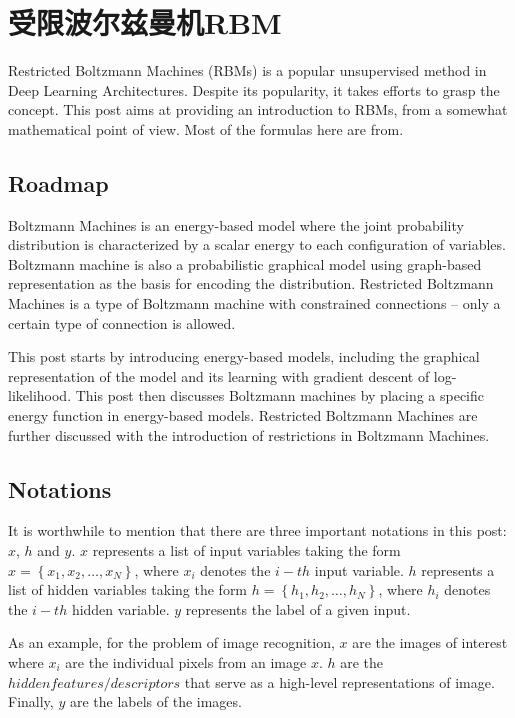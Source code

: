 \documentclass[11pt,fleqn, UTF8]{ctexbook} %
\begin{document}

\chapter{受限波尔兹曼机RBM}

Restricted Boltzmann Machines (RBMs) is a popular unsupervised method in Deep Learning Architectures. Despite its popularity, it takes efforts to grasp the concept. This post aims at providing an introduction to RBMs, from a somewhat mathematical point of view. Most of the formulas here are from\cite{bengio2009learning}.
\section{Roadmap}
Boltzmann Machines is an energy-based model where the joint probability distribution is characterized by a scalar energy to each configuration of variables. Boltzmann machine is also a probabilistic graphical model using graph-based representation as the basis for encoding the distribution. Restricted Boltzmann Machines is a type of Boltzmann machine with constrained connections – only a certain type of connection is allowed.

This post starts by introducing energy-based models, including the graphical representation of the model and its learning with gradient descent of log-likelihood. This post then discusses Boltzmann machines by placing a specific energy function in energy-based models. Restricted Boltzmann Machines are further discussed with the introduction of restrictions in Boltzmann Machines.
\section{Notations}
It is worthwhile to mention that there are three important notations in this post: $x$, $h$ and $y$. $x$ represents a list of input variables taking the form $x=\left \{ x_{1}, x_{2},\dots ,x_{N} \right \}$, where $x_{i}$ denotes the $i-th$ input variable. $h$ represents a list of hidden variables taking the form $h=\left \{ h_{1}, h_{2},\dots ,h_{N} \right \}$, where $h_{i}$ denotes the $i-th$ hidden variable. $y$ represents the label of a given input.

As an example, for the problem of image recognition, $x$ are the images of interest where $x_{i}$ are the individual pixels from an image $x$. $h$ are the $hidden features/descriptors$ that serve as a high-level representations of image. Finally, $y$ are the labels of the images.
\end{document}
